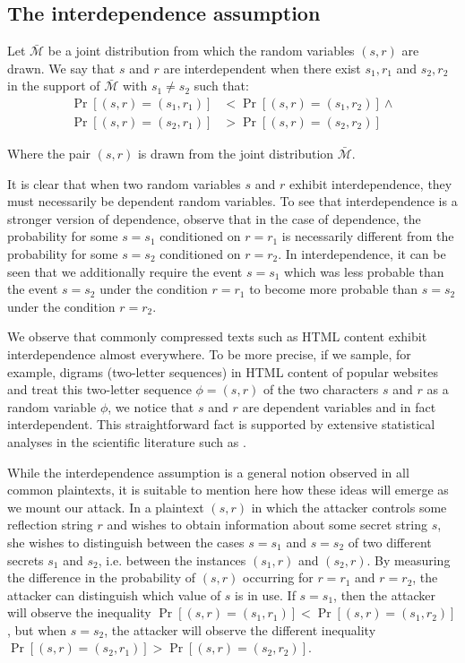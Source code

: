 \subsection{The interdependence assumption}\label{subsec:interdependence}

Let $\bar{\mathcal{M}}$ be a joint distribution from which the random variables
$(s, r)$ are drawn. We say that $s$ and $r$ are interdependent when there exist
$s_1, r_1$ and $s_2, r_2$ in the support of $\bar{\mathcal{M}}$ with $s_1 \neq
s_2$ such that:
\begin{align*}
    \Pr[(s, r) = (s_1, r_1)] &< \Pr[(s, r) = (s_1, r_2)]
\land\\
    \Pr[(s, r) = (s_2, r_1)] &> \Pr[(s, r) = (s_2, r_2)]
\end{align*}

Where the pair $(s, r)$ is drawn from the joint distribution
$\bar{\mathcal{M}}$.

It is clear that when two random variables $s$ and $r$ exhibit interdependence,
they must necessarily be dependent random variables. To see that
interdependence is a stronger version of dependence, observe that in the case
of dependence, the probability for some $s = s_1$ conditioned on $r = r_1$ is
necessarily different from the probability for some $s = s_2$ conditioned on $r
= r_2$. In interdependence, it can be seen that we additionally require the
event $s = s_1$ which was less probable than the event $s = s_2$ under the
condition $r = r_1$ to become more probable than $s = s_2$ under the condition
$r = r_2$.

We observe that commonly compressed texts such as HTML content exhibit
interdependence almost everywhere. To be more precise, if we sample, for
example, digrams (two-letter sequences) in HTML content of popular websites and
treat this two-letter sequence $\phi = (s, r)$ of the two characters $s$ and $r$
as a random variable $\phi$, we notice that $s$ and $r$ are dependent variables
and in fact interdependent. This straightforward fact is supported by extensive
statistical analyses in the scientific literature such as
\cite{norvig2013english}.

While the interdependence assumption is a general notion observed in all common
plaintexts, it is suitable to mention here how these ideas will emerge as we
mount our attack. In a plaintext $(s, r)$ in which the attacker controls some
reflection string $r$ and wishes to obtain information about some secret string
$s$, she wishes to distinguish between the cases $s = s_1$ and $s = s_2$ of two
different secrets $s_1$ and $s_2$, i.e. between the instances $(s_1, r)$ and
$(s_2, r)$. By measuring the difference in the probability of $(s, r)$
occurring for $r = r_1$ and $r = r_2$, the attacker can distinguish which value
of $s$ is in use. If $s = s_1$, then the attacker will observe the inequality
$\Pr[(s, r) = (s_1, r_1)] < \Pr[(s, r) = (s_1, r_2)]$, but when $s = s_2$, the
attacker will observe the different inequality $\Pr[(s, r) = (s_2, r_1)] >
\Pr[(s, r) = (s_2, r_2)]$.

